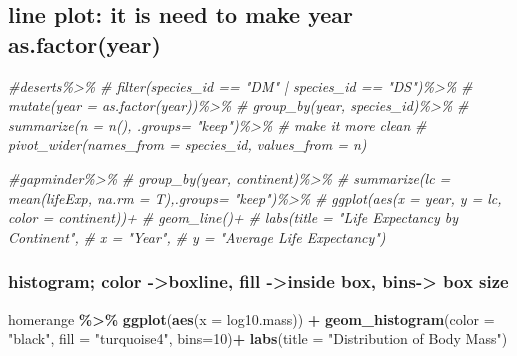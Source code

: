 \documentclass[
]{article}
\newenvironment{Shaded}{\begin{snugshade}}{\end{snugshade}}
\newcommand{\AttributeTok}[1]{\textcolor[rgb]{0.13,0.29,0.53}{#1}}
\newcommand{\CommentTok}[1]{\textcolor[rgb]{0.56,0.35,0.01}{\textit{#1}}}
\newcommand{\DecValTok}[1]{\textcolor[rgb]{0.00,0.00,0.81}{#1}}
\newcommand{\FunctionTok}[1]{\textcolor[rgb]{0.13,0.29,0.53}{\textbf{#1}}}
\newcommand{\NormalTok}[1]{#1}
\newcommand{\SpecialCharTok}[1]{\textcolor[rgb]{0.81,0.36,0.00}{\textbf{#1}}}
\newcommand{\StringTok}[1]{\textcolor[rgb]{0.31,0.60,0.02}{#1}}
\begin{document}
\hypertarget{line-plot-it-is-need-to-make-year-as.factoryear}{%
\subsection{line plot: it is need to make year
as.factor(year)}\label{line-plot-it-is-need-to-make-year-as.factoryear}}

\begin{Shaded}
\begin{Highlighting}[]
\CommentTok{\#deserts\%\textgreater{}\%}
\CommentTok{\#  filter(species\_id == "DM" | species\_id == "DS")\%\textgreater{}\%}
\CommentTok{\#  mutate(year = as.factor(year))\%\textgreater{}\%}
\CommentTok{\#  group\_by(year, species\_id)\%\textgreater{}\%}
\CommentTok{\#  summarize(n = n(), .groups= "keep")\%\textgreater{}\% \# make it more clean}
\CommentTok{\#  pivot\_wider(names\_from = species\_id, values\_from = n)}
\end{Highlighting}
\end{Shaded}

\begin{Shaded}
\begin{Highlighting}[]
\CommentTok{\#gapminder\%\textgreater{}\%}
\CommentTok{\#  group\_by(year, continent)\%\textgreater{}\%}
\CommentTok{\#  summarize(lc = mean(lifeExp, na.rm = T),.groups= "keep")\%\textgreater{}\%}
\CommentTok{\#  ggplot(aes(x = year, y = lc, color = continent))+}
\CommentTok{\#  geom\_line()+}
\CommentTok{\#  labs(title = "Life Expectancy by Continent",}
\CommentTok{\#       x = "Year",}
\CommentTok{\#       y = "Average Life Expectancy")}
\end{Highlighting}
\end{Shaded}

\hypertarget{histogram-color--boxline-fill--inside-box-bins--box-size}{%
\subsubsection{histogram; color -\textgreater boxline, fill
-\textgreater inside box, bins-\textgreater{} box
size}\label{histogram-color--boxline-fill--inside-box-bins--box-size}}

\begin{Shaded}
\begin{Highlighting}[]
\NormalTok{homerange }\SpecialCharTok{\%\textgreater{}\%} 
  \FunctionTok{ggplot}\NormalTok{(}\FunctionTok{aes}\NormalTok{(}\AttributeTok{x =}\NormalTok{ log10.mass)) }\SpecialCharTok{+}
  \FunctionTok{geom\_histogram}\NormalTok{(}\AttributeTok{color =} \StringTok{"black"}\NormalTok{, }\AttributeTok{fill =} \StringTok{"turquoise4"}\NormalTok{, }\AttributeTok{bins=}\DecValTok{10}\NormalTok{)}\SpecialCharTok{+}
  \FunctionTok{labs}\NormalTok{(}\AttributeTok{title =} \StringTok{"Distribution of Body Mass"}\NormalTok{)}
\end{Highlighting}
\end{Shaded}
\end{document}
